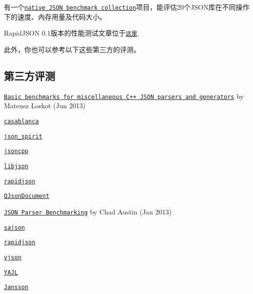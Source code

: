 有一个\href{https://github.com/miloyip/nativejson-benchmark}{\tt native J\+S\+ON benchmark collection}项目，能评估20个\+J\+S\+O\+N库在不同操作下的速度、內存用量及代码大小。

Rapid\+J\+S\+ON 0.\+1版本的性能测试文章位于\href{https://code.google.com/p/rapidjson/wiki/Performance}{\tt 这里}.

此外，你也可以参考以下这些第三方的评测。

\subsection*{第三方评测}


\begin{DoxyItemize}
\item \href{https://github.com/mloskot/json_benchmark}{\tt Basic benchmarks for miscellaneous C++ J\+S\+ON parsers and generators} by Mateusz Loskot (Jun 2013)
\begin{DoxyItemize}
\item \href{https://casablanca.codeplex.com/}{\tt casablanca}
\item \href{https://github.com/cierelabs/json_spirit}{\tt json\+\_\+spirit}
\item \href{http://jsoncpp.sourceforge.net/}{\tt jsoncpp}
\item \href{http://sourceforge.net/projects/libjson/}{\tt libjson}
\item \href{https://github.com/miloyip/rapidjson/}{\tt rapidjson}
\item \href{http://qt-project.org/doc/qt-5.0/qtcore/qjsondocument.html}{\tt Q\+Json\+Document}
\end{DoxyItemize}
\item \href{http://chadaustin.me/2013/01/json-parser-benchmarking/}{\tt J\+S\+ON Parser Benchmarking} by Chad Austin (Jan 2013)
\begin{DoxyItemize}
\item \href{https://github.com/chadaustin/sajson}{\tt sajson}
\item \href{https://github.com/miloyip/rapidjson/}{\tt rapidjson}
\item \href{https://code.google.com/p/vjson/}{\tt vjson}
\item \href{http://lloyd.github.com/yajl/}{\tt Y\+A\+JL}
\item \href{http://www.digip.org/jansson/}{\tt Jansson} 
\end{DoxyItemize}
\end{DoxyItemize}